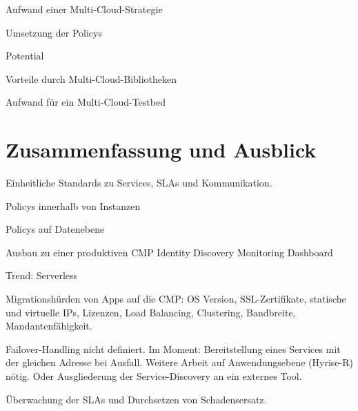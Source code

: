 Aufwand einer Multi-Cloud-Strategie

Umsetzung der Policys

Potential

Vorteile durch Multi-Cloud-Bibliotheken

Aufwand für ein Multi-Cloud-Testbed

\chapter{Zusammenfassung und Ausblick}

Einheitliche Standards zu Services, SLAs und Kommunikation.

Policys innerhalb von Instanzen 

Policys auf Datenebene

Ausbau zu einer produktiven CMP
Identity
Discovery
Monitoring
Dashboard

Trend: Serverless

Migrationshürden von Apps auf die CMP: OS Version, SSL-Zertifikate, statische und virtuelle IPs, Lizenzen, Load Balancing, Clustering, Bandbreite, Mandantenfähigkeit.

Failover-Handling nicht definiert. Im Moment: Bereitstellung eines Services mit der gleichen Adresse bei Ausfall. Weitere Arbeit auf Anwendungsebene (Hyrise-R) nötig. Oder Ausgliederung der Service-Discovery an ein externes Tool.

Überwachung der SLAs und Durchsetzen von Schadensersatz.
